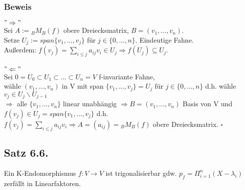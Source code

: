 \documentclass[a4paper, 12pt]{extarticle}
\begin{document}
\subsubsection*{Beweis}
$"\Rightarrow"$ \\
Sei $A:={}_BM_B(f)$ obere Dreiecksmatrix, $B=(v_1,...,v_n)$. \\
Setze $U_j:=span\{v_1,...,v_j\}$ für $j\in \{0,...,n\}$. Eindeutige Fahne. \\
Außerdem: $f(v_j) = \sum_{i\leq j} a_{ij}v_i \in U_j \Rightarrow f(U_j) \subseteq U_j$. \\ \\
$"\Leftarrow"$ \\
Sei  ${0} = U_0 \subset U_1 \subset ... \subset U_n = V$ f-invariante Fahne, \\
wähle $(v_1,...,v_n)$ in V mit span $\{v_1,...,v_j\} = U_j$ für $j\in\{0,...,n\}$ d.h. wähle $v_j \in U_j\backslash U_{j-1}$\\
$\Rightarrow$ alle $\{v_1,...,v_n\}$ linear unabhängig $\Rightarrow B=(v_1,...,v_n)$ Basis von V und $f(v_j)\in U_j = span \{v_1,...,v_j\}$ d.h. $f(v_j) = \sum_{i\leq j} a_{ij}v_i \Rightarrow A=(a_{ij})={}_BM_B(f)$ obere Dreiecksmatrix. $\square$
\subsection*{Satz 6.6.}
Ein K-Endomorphismus $f:V\to V$ ist trigonalisierbar gdw. $p_f= \Pi_{i=1}^n(X-\lambda_i)$ zerfällt in Linearfaktoren.
\end{document}
